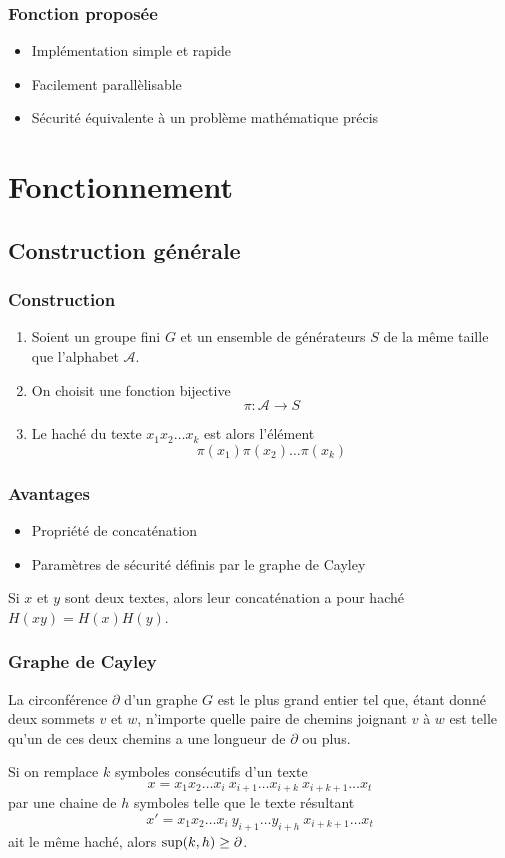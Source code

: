 \documentclass{beamer}
\newcommand{\A}{\mathcal{A}}
\begin{document}
\begin{frame}
 \frametitle{Fonction proposée}
 \begin{itemize}
  \item Implémentation simple et rapide
  \item Facilement parallèlisable
  \item Sécurité équivalente à un problème mathématique précis
 \end{itemize}
\end{frame}

\section{Fonctionnement}
\subsection{Construction générale}

\begin{frame}
 \frametitle{Construction}
 \begin{enumerate}
 \item Soient un groupe fini $G$ et un ensemble de générateurs $S$ de la même taille que l'alphabet $\A$.
 \pause
 \item On choisit une fonction bijective $$ \pi: \A \longrightarrow S$$
 \pause
 \item Le haché du texte $x_1x_2 \ldots x_k$ est alors l'élément $$ \pi(x_1)\pi(x_2) \ldots \pi(x_k) $$
 \end{enumerate}
\end{frame}

\begin{frame}
 \frametitle{Avantages}
 \begin{itemize}
  \item Propriété de concaténation
  \item Paramètres de sécurité définis par le graphe de Cayley
 \end{itemize}
 \pause 
 \begin{definition}[Concaténation]
  Si $x$ et $y$ sont deux textes, alors leur concaténation a pour haché $H(xy) = H(x)H(y)$.
 \end{definition}
\end{frame}

\begin{frame}
 \frametitle{Graphe de Cayley}
 
 \begin{definition}
  La circonférence $\partial$ d'un graphe $G$ est le plus grand entier tel que, étant donné deux sommets $v$ et $w$,
  n'importe quelle paire de chemins joignant $v$ à $w$ est telle qu'un de ces deux chemins a une longueur
  de $\partial$ ou plus.
 \end{definition}
 \pause
 Si on remplace $k$ symboles consécutifs d'un texte 
 $$ x = x_1x_2 \ldots x_i \ \boxed{x_{i+1} \ldots x_{i+k}} \ x_{i+k+1} \ldots x_t $$
 par une chaine de $h$ symboles telle que le texte résultant
 $$ x' = x_1x_2 \ldots x_i \ \boxed{y_{i+1} \ldots y_{i+h}} \ x_{i+k+1} \ldots x_t $$
 ait le même haché, alors ${\rm sup}(k, h) \ge \partial$.
\end{frame}
\end{document}
